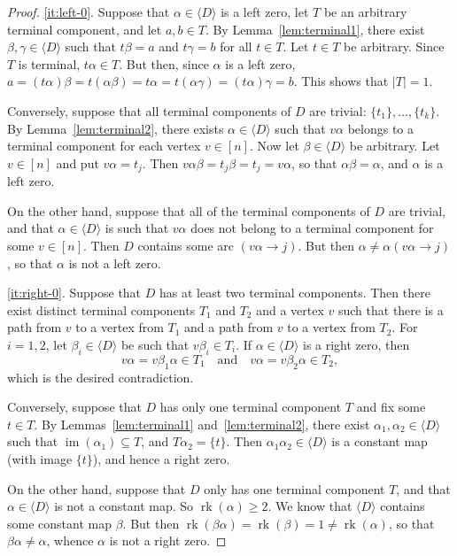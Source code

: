 \documentclass[ALCO,ThmDefs,Unicode,epreuves]{cedram}
\DeclareMathOperator{\im}{im}
\DeclareMathOperator{\rk}{rk}
\newcommand{\genset}[1]{\langle#1\rangle}
\newcommand{\nset}{[n]}
\begin{document}
\begin{proof}
\ref{it:left-0}. Suppose that $\alpha\in\genset{D}$ is a left zero, let $T$
 be an arbitrary terminal component, and let $a,b\in T$. By
 Lemma~\ref{lem:terminal1}, there exist $\beta,\gamma\in\genset{D}$ such that
 $t\beta=a$ and $t\gamma=b$ for all $t\in T$. Let $t\in T$ be arbitrary.
 Since $T$ is terminal, $t\alpha\in T$. But then, since $\alpha$ is a left
 zero,
 $a=(t\alpha)\beta=t(\alpha\beta)=t\alpha=t(\alpha\gamma)=(t\alpha)\gamma=b$.
 This shows that $|T|=1$.

 Conversely, suppose that all terminal components of $D$ are trivial:
 $\{t_1\}, \dots, \{t_k\}$. By Lemma~\ref{lem:terminal2}, there exists
 $\alpha\in\genset D$ such that $v \alpha$ belongs to a terminal component for
 each vertex $v\in\nset$. Now let $\beta\in\genset{D}$ be
 arbitrary. Let $v\in\nset$ and put $v\alpha=t_j$. Then
 $v\alpha\beta=t_j\beta=t_j=v\alpha$, so that $\alpha\beta=\alpha$, and
 $\alpha$ is a left zero.

 On the other hand, suppose that all of the terminal components of $D$ are
 trivial, and that $\alpha\in\genset{D}$ is such that $v \alpha$ does not
 belong to a terminal component for some $v\in\nset$. Then $D$
 contains some arc $(v\alpha\to j)$. But then $\alpha\not=\alpha(v\alpha\to
 j)$, so that $\alpha$ is not a left zero.

\ref{it:right-0}. Suppose that $D$ has at least two terminal components.
 Then there exist distinct terminal components $T_1$ and $T_2$ and a vertex
 $v$ such that there is a path from $v$ to a vertex from $T_1$ and a path from
 $v$ to a vertex from $T_2$. For $i=1,2$, let $\beta_i\in\genset{D}$ be such
 that $v \beta_i \in T_i$. If $\alpha \in \genset{D}$ is a right zero, then
 \[
 v \alpha = v \beta_1 \alpha \in T_1 \quad\text{and}\quad v \alpha = v
 \beta_2 \alpha \in T_2,
 \]
 which is the desired contradiction. 

 Conversely, suppose that $D$ has only one terminal component $T$ and fix some
 $t\in T$. By Lemmas~\ref{lem:terminal1} and~\ref{lem:terminal2}, there exist
 $\alpha_1,\alpha_2\in\genset{D}$ such that $\im(\alpha_1)\subseteq T$, and
 $T\alpha_2=\{t\}$. Then $\alpha_1\alpha_2\in\genset{D}$ is a constant map
 (with image $\{t\}$), and hence a right zero.

 On the other hand, suppose that $D$ only has one terminal component $T$, and
 that $\alpha\in\genset{D}$ is not a constant map. So $\rk(\alpha)\geq2$. We
 know that $\genset{D}$ contains some constant map $\beta$. But then
 $\rk(\beta\alpha)=\rk(\beta)=1\not=\rk(\alpha)$, so that
 $\beta\alpha\not=\alpha$, whence $\alpha$ is not a right zero.
\end{proof}
\end{document}
